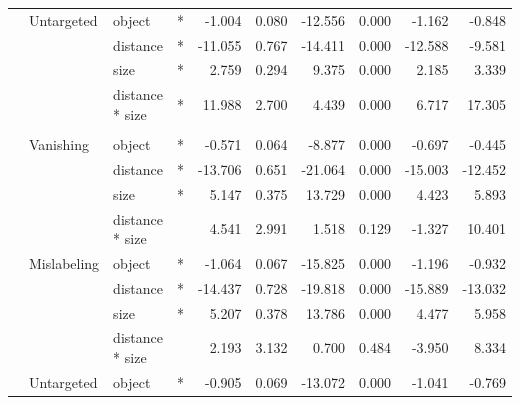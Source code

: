 \documentclass[
]{article}
\begin{document}
\begin{longtable}[t]{llllrrrrrr}
\cmidrule{2-10}\nopagebreak
\hspace{1em} & Untargeted & object & * & -1.004 & 0.080 & -12.556 & 0.000 & -1.162 & -0.848\\
\cmidrule{3-10}\nopagebreak
\hspace{1em} &  & distance & * & -11.055 & 0.767 & -14.411 & 0.000 & -12.588 & -9.581\\
\cmidrule{3-10}\nopagebreak
\hspace{1em} &  & size & * & 2.759 & 0.294 & 9.375 & 0.000 & 2.185 & 3.339\\
\cmidrule{3-10}\nopagebreak
\hspace{1em} &  & distance * size & * & 11.988 & 2.700 & 4.439 & 0.000 & 6.717 & 17.305\\
\cmidrule{1-10}\pagebreak[0]
\addlinespace[0.3em]
\multicolumn{10}{l}{\textbf{SSD}}\\
\hspace{1em} & Vanishing & object & * & -0.571 & 0.064 & -8.877 & 0.000 & -0.697 & -0.445\\
\cmidrule{3-10}\nopagebreak
\hspace{1em} &  & distance & * & -13.706 & 0.651 & -21.064 & 0.000 & -15.003 & -12.452\\
\cmidrule{3-10}\nopagebreak
\hspace{1em} &  & size & * & 5.147 & 0.375 & 13.729 & 0.000 & 4.423 & 5.893\\
\cmidrule{3-10}\nopagebreak
\hspace{1em} &  & distance * size &  & 4.541 & 2.991 & 1.518 & 0.129 & -1.327 & 10.401\\
\cmidrule{2-10}\nopagebreak
\hspace{1em} & Mislabeling & object & * & -1.064 & 0.067 & -15.825 & 0.000 & -1.196 & -0.932\\
\cmidrule{3-10}\nopagebreak
\hspace{1em} &  & distance & * & -14.437 & 0.728 & -19.818 & 0.000 & -15.889 & -13.032\\
\cmidrule{3-10}\nopagebreak
\hspace{1em} &  & size & * & 5.207 & 0.378 & 13.786 & 0.000 & 4.477 & 5.958\\
\cmidrule{3-10}\nopagebreak
\hspace{1em} &  & distance * size &  & 2.193 & 3.132 & 0.700 & 0.484 & -3.950 & 8.334\\
\cmidrule{2-10}\nopagebreak
\hspace{1em} & Untargeted & object & * & -0.905 & 0.069 & -13.072 & 0.000 & -1.041 & -0.769\\

\end{longtable}
\end{document}
